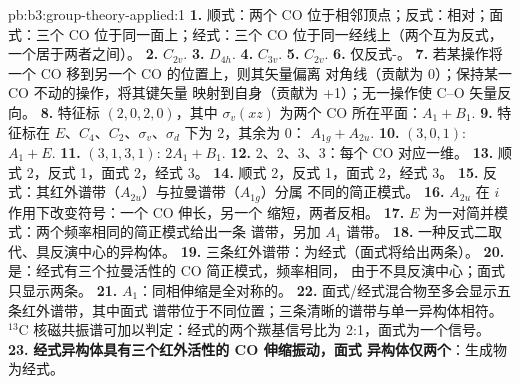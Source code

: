 \begin{solution}{pb:b3:group-theory-applied:1}
\textbf{1.} 顺式：两个 CO 位于相邻顶点；反式：相对；面式：三个
CO 位于同一面上；经式：三个 CO 位于同一经线上（两个互为反式，一个居于两者之间）。
\textbf{2.} $C_{2v}$.
\textbf{3.} $D_{4h}$.
\textbf{4.} $C_{3v}$.
\textbf{5.} $C_{2v}$.
\textbf{6.} 仅反式-。
\textbf{7.} 若某操作将一个 CO 移到另一个 CO 的位置上，则其矢量偏离
对角线（贡献为 0）；保持某一 CO 不动的操作，将其键矢量
映射到自身（贡献为 +1）；无一操作使 C--O 矢量反向。
\textbf{8.} 特征标 $(2, 0, 2, 0)$，其中 $\sigma_v(xz)$ 为两个 CO 所在平面：$A_1 +
B_1$.
\textbf{9.} 特征标在 $E$、$C_4$、$C_2$、$\sigma_v$、$\sigma_d$ 下为 2，其余为 0：
$A_{1g} + A_{2u}$.
\textbf{10.} $(3, 0, 1)$: $A_1 + E$.
\textbf{11.} $(3, 1, 3, 1)$: $2A_1 + B_1$.
\textbf{12.} 2、2、3、3：每个 CO 对应一维。
\textbf{13.} 顺式 2，反式 1，面式 2，经式 3。
\textbf{14.} 顺式 2，反式 1，面式 2，经式 3。
\textbf{15.} 反式：其红外谱带（$A_{2u}$）与拉曼谱带（$A_{1g}$）分属
不同的简正模式。
\textbf{16.} $A_{2u}$ 在 $i$ 作用下改变符号：一个 CO 伸长，另一个
缩短，两者反相。
\textbf{17.} $E$ 为一对简并模式：两个频率相同的简正模式给出一条
谱带，另加 $A_1$ 谱带。
\textbf{18.} 一种反式二取代、具反演中心的异构体。
\textbf{19.} 三条红外谱带：为经式（面式将给出两条）。
\textbf{20.} 是：经式有三个拉曼活性的 CO 简正模式，频率相同，
由于不具反演中心；面式只显示两条。
\textbf{21.} $A_1$：同相伸缩是全对称的。
\textbf{22.} 面式/经式混合物至多会显示五条红外谱带，其中面式
谱带位于不同位置；三条清晰的谱带与单一异构体相符。
${}^{13}$C 核磁共振谱可加以判定：经式的两个羰基信号比为
2:1，面式为一个信号。
\textbf{23.} \textbf{经式异构体具有三个红外活性的 CO 伸缩振动，面式
异构体仅两个}：生成物为经式。
\end{solution}
